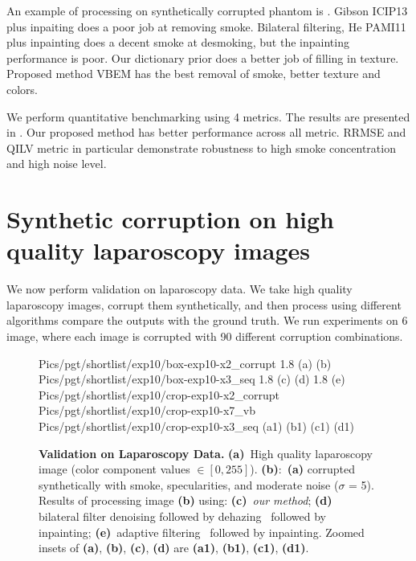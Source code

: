 An example of processing on synthetically corrupted phantom is . Gibson ICIP13 \cite{gibson2013wiener} plus inpaiting does a poor job at removing smoke. Bilateral filtering, He PAMI11 \cite{he2011dark} plus inpainting does a decent smoke at desmoking, but the inpainting performance is poor. Our dictionary prior does a better job of filling in texture. Proposed method VBEM has the best removal of smoke, better texture and colors.

We perform quantitative benchmarking using 4 metrics. The results are presented in . Our proposed method has better performance across all metric. RRMSE and QILV metric in particular demonstrate robustness to high smoke concentration and high noise level.

\section{Synthetic corruption on high quality laparoscopy images}
We now perform validation on laparoscopy data. We take high quality laparoscopy images, corrupt them synthetically, and then process using different algorithms compare the outputs with the ground truth. We run experiments on 6 image, where each image is corrupted with 90 different corruption combinations.

\begin{figure}[!h]
     {Pics/pgt/shortlist/exp10/box-exp10-x2_corrupt} {1.8} {(a)} {(b)}
     {Pics/pgt/shortlist/exp10/box-exp10-x3_seq} {1.8} {(c)} {(d)}
     {1.8} {(e)}
     {Pics/pgt/shortlist/exp10/crop-exp10-x2_corrupt} {Pics/pgt/shortlist/exp10/crop-exp10-x7_vb} {Pics/pgt/shortlist/exp10/crop-exp10-x3_seq}  {(a1)} {(b1)} {(c1)} {(d1)}
    \caption
    {
        {\bf Validation on Laparoscopy Data. }
        {\bf (a)}~High quality laparoscopy image (color component values $\in [0,255]$).
        {\bf (b)}:~{\bf (a)} corrupted synthetically with smoke, specularities, and moderate noise ($\sigma$ = 5).
        Results of processing image {\bf (b)} using:
        {\bf (c)}~{\em our method};
        {\bf (d)}~ bilateral filter denoising followed by dehazing~\cite{he2011dark} followed by inpainting;
        {\bf (e)}~adaptive filtering~\cite{gibson2013wiener} followed by inpainting.
        Zoomed insets of {\bf (a)}, {\bf (b)}, {\bf (c)}, {\bf (d)} are {\bf (a1)}, {\bf (b1)}, {\bf (c1)}, {\bf (d1)}.
    }
    \label{fig:imagesPgt1}
\end{figure}

